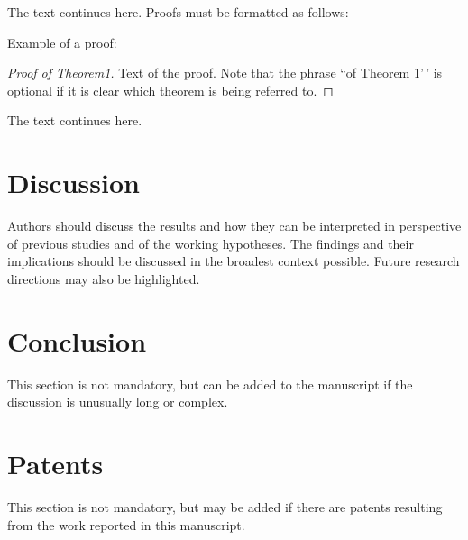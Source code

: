 \documentclass[notspecified,article,submit,moreauthors,pdftex]{Definitions/mdpi}
\begin{document}
The text continues here. Proofs must be formatted as follows:

Example of a proof:

\begin{proof}[Proof of Theorem1]
Text of the proof. Note that the phrase ``of Theorem 1'\,' is optional
if it is clear which theorem is being referred to.

\end{proof}

The text continues here.

\section{Discussion}\label{discussion}

Authors should discuss the results and how they can be interpreted in
perspective of previous studies and of the working hypotheses. The
findings and their implications should be discussed in the broadest
context possible. Future research directions may also be highlighted.

\section{Conclusion}\label{conclusion}

This section is not mandatory, but can be added to the manuscript if the
discussion is unusually long or complex.

\section{Patents}\label{patents}

This section is not mandatory, but may be added if there are patents
resulting from the work reported in this manuscript.


\vspace{6pt}


\end{document}
